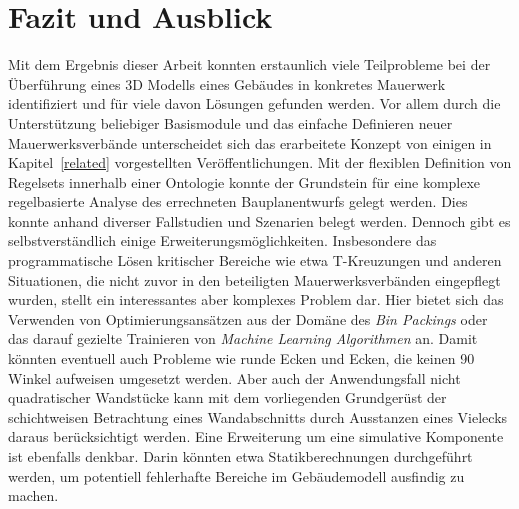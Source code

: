 \chapter{Fazit und Ausblick}
Mit dem Ergebnis dieser Arbeit konnten erstaunlich viele Teilprobleme bei der Überführung eines 3D Modells eines Gebäudes in konkretes Mauerwerk identifiziert und für viele davon Lösungen gefunden werden.
Vor allem durch die Unterstützung beliebiger Basismodule und das einfache Definieren neuer Mauerwerksverbände unterscheidet sich das erarbeitete Konzept von einigen in Kapitel~\ref{related} vorgestellten Veröffentlichungen.
Mit der flexiblen Definition von Regelsets innerhalb einer Ontologie konnte der Grundstein für eine komplexe regelbasierte Analyse des errechneten Bauplanentwurfs gelegt werden.
Dies konnte anhand diverser Fallstudien und Szenarien belegt werden.
Dennoch gibt es selbstverständlich einige Erweiterungsmöglichkeiten.
Insbesondere das programmatische Lösen kritischer Bereiche wie etwa T-Kreuzungen und anderen Situationen, die nicht zuvor in den beteiligten Mauerwerksverbänden eingepflegt wurden, stellt ein interessantes aber komplexes Problem dar.
Hier bietet sich das Verwenden von Optimierungsansätzen aus der Domäne des \textit{Bin Packings} oder das darauf gezielte Trainieren von \textit{Machine Learning Algorithmen} an.
Damit könnten eventuell auch Probleme wie runde Ecken und Ecken, die keinen 90\textdegree{} Winkel aufweisen umgesetzt werden.
Aber auch der Anwendungsfall nicht quadratischer Wandstücke kann mit dem vorliegenden Grundgerüst der schichtweisen Betrachtung eines Wandabschnitts durch \glqq{}Ausstanzen\grqq{} eines Vielecks daraus berücksichtigt werden.
Eine Erweiterung um eine simulative Komponente ist ebenfalls denkbar.
Darin könnten etwa Statikberechnungen durchgeführt werden, um potentiell fehlerhafte Bereiche im Gebäudemodell ausfindig zu machen.